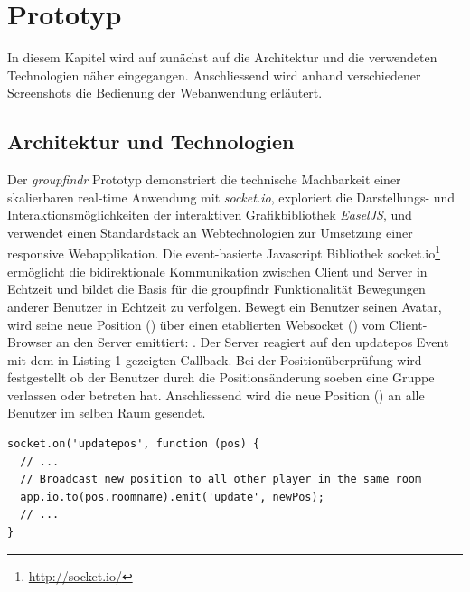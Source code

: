 \chapter{Prototyp}
\label{prototyp}

In diesem Kapitel wird auf zunächst auf die Architektur und die verwendeten Technologien näher eingegangen. Anschliessend wird anhand verschiedener Screenshots die Bedienung der Webanwendung erläutert.

\section{Architektur und Technologien}
\label{architektur_technologie}

Der \emph{groupfindr} Prototyp demonstriert die technische Machbarkeit einer skalierbaren real-time Anwendung mit \emph{socket.io}, exploriert die Darstellungs- und Interaktionsmöglichkeiten der interaktiven Grafikbibliothek \emph{EaselJS}, und verwendet einen Standardstack an Webtechnologien zur Umsetzung einer responsive Webapplikation.
\newline\newline
Die event-basierte Javascript Bibliothek socket.io\footnote{\url{http://socket.io/}} ermöglicht die bidirektionale Kommunikation zwischen Client und Server in Echtzeit und bildet die Basis für die groupfindr Funktionalität Bewegungen anderer Benutzer in Echtzeit zu verfolgen. Bewegt ein Benutzer seinen Avatar, wird seine neue Position () über einen etablierten Websocket () vom Client-Browser an den Server emittiert: . Der Server reagiert auf den updatepos Event mit dem in Listing 1 gezeigten Callback. Bei der Positionüberprüfung wird festgestellt ob der Benutzer durch die Positionsänderung soeben eine Gruppe verlassen oder betreten hat. Anschliessend wird die neue Position () an alle Benutzer im selben Raum gesendet.

\begin{lstlisting}[caption=Server Implementation des \emph{updatepos} Event]
socket.on('updatepos', function (pos) { 
  // ... 
  // Broadcast new position to all other player in the same room 
  app.io.to(pos.roomname).emit('update', newPos); 
  // ... 
}
\end{lstlisting}

